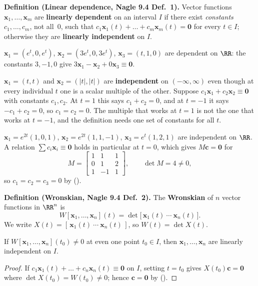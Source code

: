 \documentclass[10pt]{scrartcl}
\newcommand{\vv}[1]{\mathbf{#1}}
\begin{document}
\noindent\textbf{Definition (Linear dependence, Nagle 9.4 Def.~1).} Vector functions $\vv x_1,\dots,\vv x_m$ are \textbf{linearly dependent} on an interval $I$ if there exist \emph{constants} $c_1,\dots,c_m$, not all~$0$, such that $c_1\vv x_1(t)+\dots+c_m\vv x_m(t)=\vv 0$ for every $t\in I$; otherwise they are \textbf{linearly independent} on $I$.

\begin{example*}
  $\vv x_1=(e^t,0,e^t)$, $\vv x_2=(3e^t,0,3e^t)$, $\vv x_3=(t,1,0)$ are dependent on $\RR$: the constants $3,-1,0$ give $3\vv x_1-\vv x_2+0\vv x_3\equiv\vv 0$.
\end{example*}

\begin{example*}
  $\vv x_1=(t,t)$ and $\vv x_2=(|t|,|t|)$ are \textbf{independent} on $(-\infty,\infty)$ even though at every individual $t$ one is a scalar multiple of the other. Suppose $c_1\vv x_1+c_2\vv x_2\equiv\vv 0$ with constants $c_1,c_2$. At $t=1$ this says $c_1+c_2=0$, and at $t=-1$ it says $-c_1+c_2=0$, so $c_1=c_2=0$. The multiple that works at $t=1$ is not the one that works at $t=-1$, and the definition needs one set of constants for all $t$.
\end{example*}

\begin{example*}
  $\vv x_1=e^{2t}(1,0,1)$, $\vv x_2=e^{2t}(1,1,-1)$, $\vv x_3=e^t(1,2,1)$ are independent on $\RR$. A relation $\sum c_i\vv x_i\equiv\vv 0$ holds in particular at $t=0$, which gives $M\vv c=\vv 0$ for
  \[
    M=\begin{bmatrix}1&1&1\\0&1&2\\1&-1&1\end{bmatrix},\qquad \det M=4\neq 0,
  \]
  so $c_1=c_2=c_3=0$ by ().
\end{example*}

\noindent\textbf{Definition (Wronskian, Nagle 9.4 Def.~2).} The \textbf{Wronskian} of $n$ vector functions in $\RR^n$ is
\[
  W[\vv x_1,\dots,\vv x_n](t) = \det\bigl[\,\vv x_1(t)\ \cdots\ \vv x_n(t)\,\bigr].
\]
We write $X(t)=[\,\vv x_1(t)\ \cdots\ \vv x_n(t)\,]$, so $W(t)=\det X(t)$.

\begin{proposition*}
  If $W[\vv x_1,\dots,\vv x_n](t_0)\neq 0$ at even one point $t_0\in I$, then $\vv x_1,\dots,\vv x_n$ are linearly independent on $I$.
\end{proposition*}
\begin{proof}
  If $c_1\vv x_1(t)+\dots+c_n\vv x_n(t)\equiv\vv 0$ on $I$, setting $t=t_0$ gives $X(t_0)\vv c=\vv 0$ where $\det X(t_0)=W(t_0)\neq 0$; hence $\vv c=\vv 0$ by (). \qedhere
\end{proof}
\end{document}
